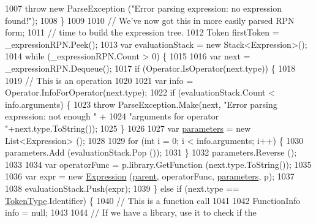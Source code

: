 \begin{DoxyCode}
1007                     \textcolor{keywordflow}{throw} \textcolor{keyword}{new} ParseException (\textcolor{stringliteral}{"Error parsing expression: no expression found!"});
1008                 \}
1009 
1010                 \textcolor{comment}{// We've now got this in more easily parsed RPN form; }
1011                 \textcolor{comment}{// time to build the expression tree.}
1012                 Token firstToken = \_expressionRPN.Peek();
1013                 var evaluationStack = \textcolor{keyword}{new} Stack<Expression>();
1014                 \textcolor{keywordflow}{while} (\_expressionRPN.Count > 0) \{
1015 
1016                     var next = \_expressionRPN.Dequeue();
1017                     \textcolor{keywordflow}{if} (Operator.IsOperator(next.type)) \{
1018 
1019                         \textcolor{comment}{// This is an operation}
1020 
1021                         var info = Operator.InfoForOperator(next.type);
1022                         \textcolor{keywordflow}{if} (evaluationStack.Count < info.arguments) \{
1023                             \textcolor{keywordflow}{throw} ParseException.Make(next, \textcolor{stringliteral}{"Error parsing expression: not enough "} +
1024                                 \textcolor{stringliteral}{"arguments for operator "}+next.type.ToString());
1025                         \}
1026 
1027                         var \hyperlink{a00082_a7b21380bead8ae08b2cfc6594edab32c}{parameters} = \textcolor{keyword}{new} List<Expression> ();
1028 
1029                         \textcolor{keywordflow}{for} (\textcolor{keywordtype}{int} i = 0; i < info.arguments; i++) \{
1030                             parameters.Add (evaluationStack.Pop ());
1031                         \}
1032                         parameters.Reverse ();
1033 
1034                         var operatorFunc = p.library.GetFunction (next.type.ToString());
1035 
1036                         var expr = \textcolor{keyword}{new} \hyperlink{a00082_a17e5101d02b96d0071e7a0223e4daa3d}{Expression} (\hyperlink{a00122_af313a82103fcc2ff5a177dbb06b92f7b}{parent}, operatorFunc, 
      \hyperlink{a00082_a7b21380bead8ae08b2cfc6594edab32c}{parameters}, p);
1037 
1038                         evaluationStack.Push(expr);
1039                     \} \textcolor{keywordflow}{else} \textcolor{keywordflow}{if} (next.type == \hyperlink{a00031_a301aa7c866593a5b625a8fc158bbeace}{TokenType}.Identifier) \{
1040                         \textcolor{comment}{// This is a function call}
1041 
1042                         FunctionInfo info = null;
1043 
1044                         \textcolor{comment}{// If we have a library, use it to check if the}

\end{DoxyCode}
